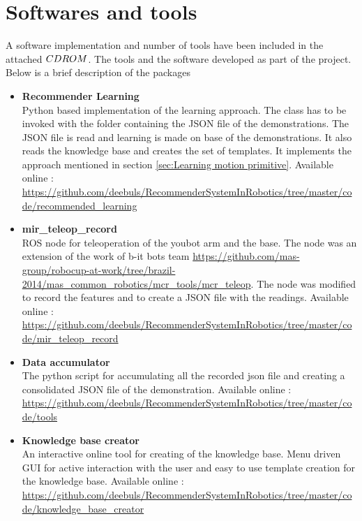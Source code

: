 \section{Softwares and tools}

A software implementation and number of tools have been included in the attached
$CD\-ROM$. The tools and the software developed as part of the project.
Below is a brief description of the packages

\begin{itemize}

    \item \textbf{Recommender Learning} \\
        Python based implementation of the learning approach. The class has to be 
        invoked with the folder containing the JSON file of the demonstrations.
        The JSON file is read and learning is made on base of the demonstrations.
        It also reads the knowledge base and creates the set of templates.
        It implements the approach mentioned in section \ref{sec:Learning motion primitive}.
        Available online : \url{https://github.com/deebuls/RecommenderSystemInRobotics/tree/master/code/recommended\_learning}

    \item \textbf{mir\_teleop\_record} \\
        ROS node for teleoperation of the youbot arm and the base. The node was 
        an extension of the work of b-it bots team \url{https://github.com/mas-group/robocup-at-work/tree/brazil-2014/mas\_common\_robotics/mcr\_tools/mcr\_teleop}.
        The node was modified to record the features and to create a JSON file with the readings.
        Available online : \url {https://github.com/deebuls/RecommenderSystemInRobotics/tree/master/code/mir\_teleop\_record }

    \item \textbf{Data accumulator} \\
        The python script for accumulating all the recorded json file and creating
        a consolidated JSON file of the demonstration.
        Available online : \url{https://github.com/deebuls/RecommenderSystemInRobotics/tree/master/code/tools }

    \item \textbf{Knowledge base creator} \\
        An interactive online tool for creating of the knowledge base.
        Menu driven GUI for active interaction with the user and easy to use
        template creation for the knowledge base.
        Available online : \url{ https://github.com/deebuls/RecommenderSystemInRobotics/tree/master/code/knowledge\_base\_creator}

\end{itemize}
